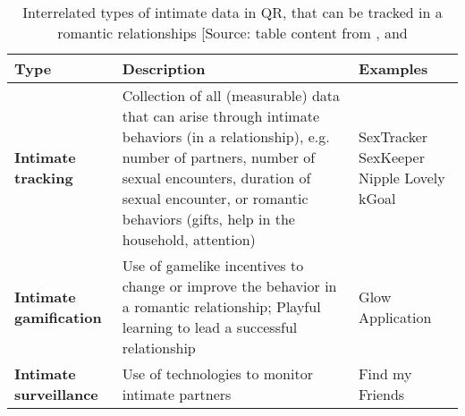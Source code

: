 \begin{table*}[t]
	\caption{Interrelated types of intimate data in \acl{QR}, that can be tracked in a romantic relationships [Source: table content from \cite{doi:10.1080/15265161.2017.1409823}, \cite{levy2014intimate} and \cite{doi:10.1080/13691058.2014.920528}}
	\label{tab:typ_of_QR}
	\scriptsize
	\begin{center}
		\begin{tabular}{|p{4cm}|p{11cm}|p{2cm}|}
			\hline
			Type & Description & Examples \\
			\hline
			\hline
			\textbf{Intimate tracking} &  Collection of all (measurable) data that can arise through intimate behaviors (in a relationship), e.g. number of partners, number of sexual encounters, duration of sexual encounter, or romantic behaviors (gifts, help in the household, attention) & SexTracker \newline SexKeeper \newline Nipple \newline Lovely \newline kGoal \\
			\hline
			\textbf{Intimate gamification} & Use of gamelike incentives to change or improve the behavior in a romantic relationship; Playful learning to lead a successful relationship & Glow Application \\
			\hline
			\textbf{Intimate surveillance} & Use of technologies to monitor intimate partners & Find my Friends \\
			\hline
		\end{tabular}
	\end{center}
\end{table*}